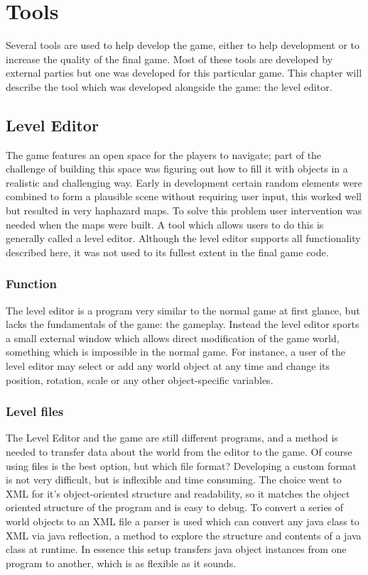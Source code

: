 \chapter{Tools}
Several tools are used to help develop the game, either to help development or to increase the quality of the final game. Most of these tools are developed by external parties but one was developed for this particular game. This chapter will describe the tool which was developed alongside the game: the level editor.

\section{Level Editor}
The game features an open space for the players to navigate; part of the challenge of building this space was figuring out how to fill it with objects in a realistic and challenging way. Early in development certain random elements were combined to form a plausible scene without requiring user input, this worked well but resulted in very haphazard maps. To solve this problem user intervention was needed when the maps were built. A tool which allows users to do this is generally called a level editor. Although the level editor supports all functionality described here, it was not used to its fullest extent in the final game code.

\subsection{Function}
The level editor is a program very similar to the normal game at first glance, but lacks the fundamentals of the game: the gameplay. Instead the level editor sports a small external window which allows direct modification of the game world, something which is impossible in the normal game. For instance, a user of the level editor may select or add any world object at any time and change its position, rotation, scale or any other object-specific variables.

\subsection{Level files}
The Level Editor and the game are still different programs, and a method is needed to transfer data about the world from the editor to the game. Of course using files is the best option, but which file format? Developing a custom format is not very difficult, but is inflexible and time consuming. The choice went to XML for it's object-oriented structure and readability, so it matches the object oriented structure of the program and is easy to debug. To convert a series of world objects to an XML file a parser is used which can convert any java class to XML via java reflection, a method to explore the structure and contents of a java class at runtime. In essence this setup transfers java object instances from one program to another, which is as flexible as it sounds.